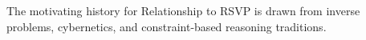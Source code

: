 The motivating history for Relationship to RSVP is drawn from inverse problems, cybernetics, and constraint-based reasoning traditions.
